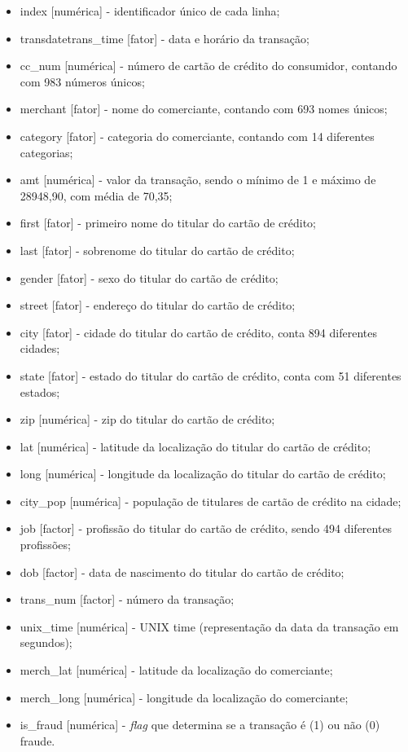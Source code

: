 \documentclass{article}
\begin{document}
\begin{itemize}
    \item index [numérica] - identificador único de cada linha;
    \item transdatetrans\_time [fator] - data e horário da transação;
    \item cc\_num [numérica] - número de cartão de crédito do consumidor, contando com 983 números únicos;
    \item merchant [fator] - nome do comerciante, contando com 693 nomes únicos;
    \item category [fator] - categoria do comerciante, contando com 14 diferentes categorias;
    \item amt [numérica] - valor da transação, sendo o mínimo de 1 e máximo de 28948,90, com média de 70,35;
    \item first [fator] - primeiro nome do titular do cartão de crédito;
    \item last [fator] - sobrenome do titular do cartão de crédito;
    \item gender [fator] - sexo do titular do cartão de crédito;
    \item street [fator] - endereço do titular do cartão de crédito;
    \item city [fator] - cidade do titular do cartão de crédito, conta 894 diferentes cidades;
    \item state [fator] - estado do titular do cartão de crédito, conta com 51 diferentes estados;
    \item zip [numérica] - zip do titular do cartão de crédito;
    \item lat [numérica] - latitude da localização do titular do cartão de crédito;
    \item long [numérica] - longitude da localização do titular do cartão de crédito;
    \item city\_pop [numérica] - população de titulares de cartão de crédito na cidade;
    \item job [factor] - profissão do titular do cartão de crédito, sendo 494 diferentes profissões;
    \item dob [factor] - data de nascimento do titular do cartão de crédito;
    \item trans\_num [factor] - número da transação;
    \item unix\_time [numérica] - UNIX time (representação da data da transação em segundos);
    \item merch\_lat [numérica] - latitude da localização do comerciante;
    \item merch\_long [numérica] - longitude da localização do comerciante;
    \item is\_fraud [numérica] - \textit{flag} que determina se a transação é (1) ou não (0) fraude. 
\end{itemize}
\end{document}
